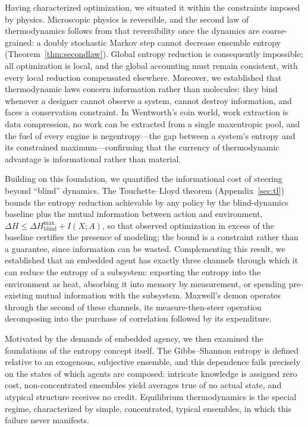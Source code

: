 \documentclass[10pt]{article}
\theoremstyle{definition}
\theoremstyle{remark}
\begin{document}
Having characterized optimization, we situated it within the constraints imposed by physics. Microscopic physics is reversible, and the second law of thermodynamics follows from that reversibility once the dynamics are coarse-grained: a doubly stochastic Markov step cannot decrease ensemble entropy (Theorem~\ref{thm:secondlaw}). Global entropy reduction is consequently impossible; all optimization is local, and the global accounting must remain consistent, with every local reduction compensated elsewhere. Moreover, we established that thermodynamic laws concern information rather than molecules: they bind whenever a designer cannot observe a system, cannot destroy information, and faces a conservation constraint. In Wentworth's coin world, work extraction is data compression, no work can be extracted from a single maxentropic pool, and the fuel of every engine is negentropy---the gap between a system's entropy and its constrained maximum---confirming that the currency of thermodynamic advantage is informational rather than material.

Building on this foundation, we quantified the informational cost of steering beyond ``blind'' dynamics. The Touchette--Lloyd theorem (Appendix~\ref{sec:tl}) bounds the entropy reduction achievable by any policy by the blind-dynamics baseline plus the mutual information between action and environment, $\Delta H \le \Delta H^{\max}_{\mathrm{blind}} + I(X;A)$, so that observed optimization in excess of the baseline certifies the presence of modeling; the bound is a constraint rather than a guarantee, since information can be wasted. Complementing this result, we established that an embedded agent has exactly three channels through which it can reduce the entropy of a subsystem: exporting the entropy into the environment as heat, absorbing it into memory by measurement, or spending pre-existing mutual information with the subsystem. Maxwell's demon operates through the second of these channels, its measure-then-steer operation decomposing into the purchase of correlation followed by its expenditure.

Motivated by the demands of embedded agency, we then examined the foundations of the entropy concept itself. The Gibbs--Shannon entropy is defined relative to an exogenous, subjective ensemble, and this dependence fails precisely on the states of which agents are composed: intricate knowledge is assigned zero cost, non-concentrated ensembles yield averages true of no actual state, and atypical structure receives no credit. Equilibrium thermodynamics is the special regime, characterized by simple, concentrated, typical ensembles, in which this failure never manifests.
\end{document}
